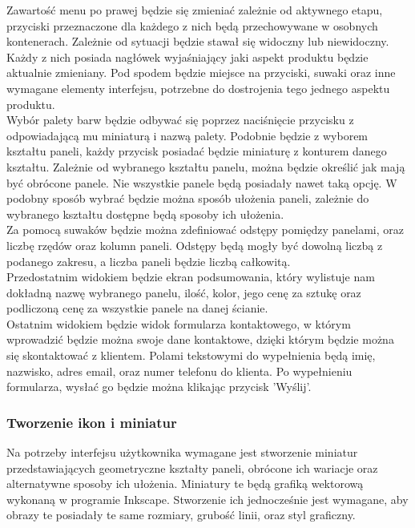 \documentclass{article} %
\begin{document}
            Zawartość menu po prawej będzie się zmieniać zależnie od aktywnego etapu, przyciski przeznaczone dla każdego z nich będą przechowywane w osobnych kontenerach. Zależnie od sytuacji będzie stawał się widoczny lub niewidoczny. Każdy z nich posiada nagłówek wyjaśniający jaki aspekt produktu będzie aktualnie zmieniany. Pod spodem będzie miejsce na przyciski, suwaki oraz inne wymagane elementy interfejsu, potrzebne do dostrojenia tego jednego aspektu produktu.
            \\
            
            Wybór palety barw będzie odbywać się poprzez naciśnięcie przycisku z odpowiadającą mu miniaturą i nazwą palety. Podobnie będzie z wyborem kształtu paneli, każdy przycisk posiadać będzie miniaturę z konturem danego kształtu. Zależnie od wybranego kształtu panelu, można będzie określić jak mają być obrócone panele. Nie wszystkie panele będą posiadały nawet taką opcję. W podobny sposób wybrać będzie można sposób ułożenia paneli, zależnie do wybranego kształtu dostępne będą sposoby ich ułożenia.
            \\
            
            Za pomocą suwaków będzie można zdefiniować odstępy pomiędzy panelami, oraz liczbę rzędów oraz kolumn paneli. Odstępy będą mogły być dowolną liczbą z podanego zakresu, a liczba paneli będzie liczbą całkowitą.
            \\
            
            Przedostatnim widokiem będzie ekran podsumowania, który wylistuje nam dokładną nazwę wybranego panelu, ilość, kolor, jego cenę za sztukę oraz podliczoną cenę za wszystkie panele na danej ścianie.
            \\
            
            Ostatnim widokiem będzie widok formularza kontaktowego, w którym wprowadzić będzie można swoje dane kontaktowe, dzięki którym będzie można się skontaktować z klientem. Polami tekstowymi do wypełnienia będą imię, nazwisko, adres email, oraz numer telefonu do klienta. Po wypełnieniu formularza, wysłać go będzie można klikając przycisk 'Wyślij'.
            \\
            
        \subsubsection*{Tworzenie ikon i miniatur}
            Na potrzeby interfejsu użytkownika wymagane jest stworzenie miniatur przedstawiających geometryczne kształty paneli, obrócone ich wariacje oraz alternatywne sposoby ich ułożenia. Miniatury te będą grafiką wektorową wykonaną w programie Inkscape. Stworzenie ich jednocześnie jest wymagane, aby obrazy te posiadały te same rozmiary, grubość linii, oraz styl graficzny.
            \\
            
\end{document}
